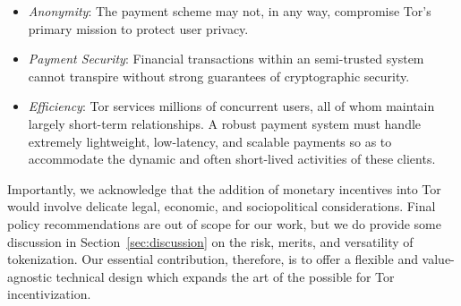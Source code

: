 \begin{itemize}
\item \emph{Anonymity}: The payment scheme may not, in any way, compromise Tor's
  primary mission to protect user privacy.
\item \emph{Payment Security}: Financial transactions within an semi-trusted system
  cannot transpire without strong guarantees of cryptographic security.
\item \emph{Efficiency}: Tor services millions of concurrent users, all of whom
  maintain largely short-term relationships. A robust payment system must handle
  extremely lightweight, low-latency, and scalable payments so as to accommodate
  the dynamic and often short-lived activities of these clients.
\end{itemize}

Importantly, we acknowledge that the addition of monetary incentives into Tor
would involve delicate legal, economic, and sociopolitical considerations. Final
policy recommendations are out of scope for our work, but we do provide some
discussion in Section~\ref{sec:discussion} on the risk, merits, and versatility
of tokenization. Our essential contribution, therefore, is to offer a flexible
and value-agnostic technical design which expands the art of the possible for
Tor incentivization.


